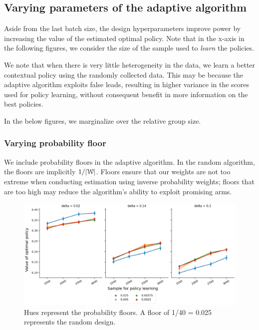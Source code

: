 \documentclass[letterpaper, 12pt, parskip=full,DIV=10]{scrartcl}
\begin{document}
\subsection{Varying parameters of the adaptive algorithm}
Aside from the last batch size, the design hyperparameters improve power by increasing the value of the estimated optimal policy. Note that in the x-axis in the following figures, we consider the size of the sample used to \textit{learn} the policies. 

We note that when there is very little heterogeneity in the data, we learn a better contextual policy using the randomly collected data. This may be because the adaptive algorithm exploits false leads, resulting in higher variance in the scores used for policy learning, without consequent benefit in more information on the best policies. 

In the below figures, we marginalize over the relative group size. %

\subsubsection{Varying probability floor}
We include probability floors in the adaptive algorithm. In the random algorithm, the floors are implicitly $ 1/ |{\EuScript W}|$. Floors ensure that our weights are not too extreme when conducting estimation using inverse probability weights; floors that are too high may reduce the algorithm's ability to exploit promising arms.

\begin{figure}[H]
\centering
\includegraphics[width=\textwidth]{figures/value_diff_control_floor.png}
\caption{
 Hues represent the probability floors. A floor of 1/40 = 0.025 represents the random design. }
\label{fig:value_control_floor}
\end{figure}
\end{document}
